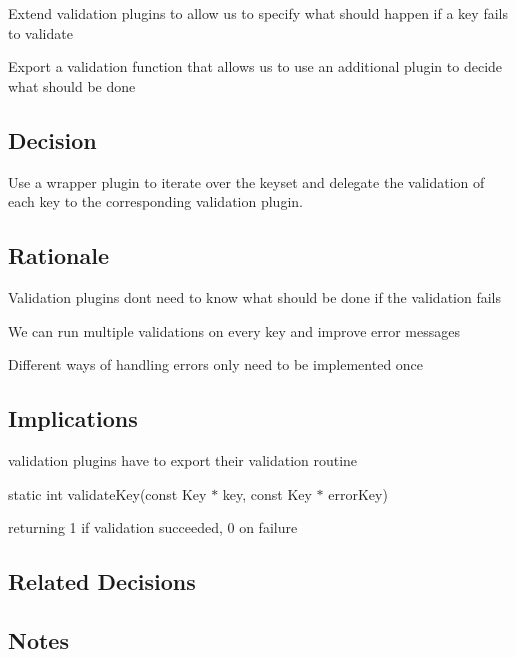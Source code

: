 \begin{DoxyItemize}
\item Extend validation plugins to allow us to specify what should happen if a key fails to validate
\item Export a validation function that allows us to use an additional plugin to decide what should be done
\end{DoxyItemize}

\subsection*{Decision}

Use a wrapper plugin to iterate over the keyset and delegate the validation of each key to the corresponding validation plugin.

\subsection*{Rationale}


\begin{DoxyItemize}
\item Validation plugins don\textquotesingle{}t need to know what should be done if the validation fails
\item We can run multiple validations on every key and improve error messages
\item Different ways of handling errors only need to be implemented once
\end{DoxyItemize}

\subsection*{Implications}

validation plugins have to export their validation routine

{\ttfamily static int validate\+Key(const Key $\ast$ key, const Key $\ast$ error\+Key)}

returning 1 if validation succeeded, 0 on failure

\subsection*{Related Decisions}

\subsection*{Notes}